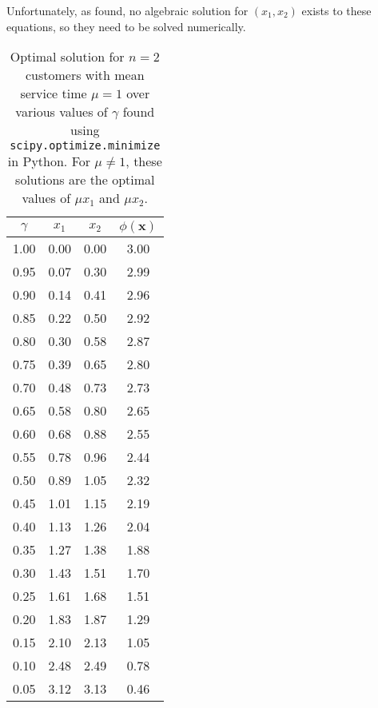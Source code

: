 Unfortunately, as \citet{Pegden} found, no algebraic solution for $(x_{1}, x_{2})$ exists to these equations, so they need to be solved numerically.

\begin{table}[htb]
\centering
\begin{tabular}{|c|c|c|c|} \hline
 $\gamma$ &  $x_{1}$ &  $x_{2}$ &  $\phi (\mathbf{x})$ \\ \hline
     1.00 &     0.00 &     0.00 &                 3.00 \\
     0.95 &     0.07 &     0.30 &                 2.99 \\
     0.90 &     0.14 &     0.41 &                 2.96 \\
     0.85 &     0.22 &     0.50 &                 2.92 \\
     0.80 &     0.30 &     0.58 &                 2.87 \\
     0.75 &     0.39 &     0.65 &                 2.80 \\
     0.70 &     0.48 &     0.73 &                 2.73 \\
     0.65 &     0.58 &     0.80 &                 2.65 \\
     0.60 &     0.68 &     0.88 &                 2.55 \\
     0.55 &     0.78 &     0.96 &                 2.44 \\
     0.50 &     0.89 &     1.05 &                 2.32 \\
     0.45 &     1.01 &     1.15 &                 2.19 \\
     0.40 &     1.13 &     1.26 &                 2.04 \\
     0.35 &     1.27 &     1.38 &                 1.88 \\
     0.30 &     1.43 &     1.51 &                 1.70 \\
     0.25 &     1.61 &     1.68 &                 1.51 \\
     0.20 &     1.83 &     1.87 &                 1.29 \\
     0.15 &     2.10 &     2.13 &                 1.05 \\
     0.10 &     2.48 &     2.49 &                 0.78 \\
     0.05 &     3.12 &     3.13 &                 0.46 \\ \hline
\end{tabular}
\caption{Optimal solution for $n = 2$ customers with mean service time $\mu = 1$ over various values of $\gamma$ found using \texttt{scipy.optimize.minimize} in Python. For $\mu \neq 1$, these solutions are the optimal values of $\mu x_{1}$ and $\mu x_{2}$.}
\end{table}











































